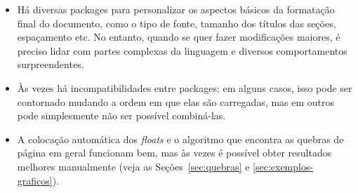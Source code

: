 \begin{itemize}
    \item Há diversas packages para personalizar os aspectos básicos
    da formatação final do documento, como o tipo de fonte, tamanho dos
    títulos das seções, espaçamento etc. No entanto, quando se quer
    fazer modificações maiores, é preciso lidar com partes complexas da
    linguagem e diversos comportamentos surpreendentes.

    \item Às vezes há incompatibilidades entre packages; em alguns casos,
    isso pode ser contornado mudando a ordem em que elas são carregadas,
    mas em outros pode simplesmente não ser possível combiná-las.

    \item A colocação automática dos \emph{floats} e o algoritmo
    que encontra as quebras de página em geral funcionam bem, mas às
    vezes é possível obter resultados melhores manualmente (veja as
    Seções~\ref{sec:quebras} e \ref{sec:exemplos-graficos}).



\end{itemize}
